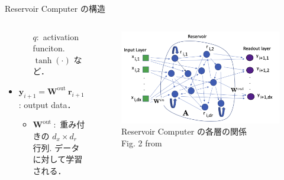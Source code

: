 \begin{frame}{Reservoir Computer の構造}
\begin{columns}[T]
\begin{column}{.5\textwidth}
\begin{itemize}
\begin{itemize}
                    $q:$ activation funciton. $\tanh(\cdot)$ など．
                \end{itemize}
                \item $\mathbf{y}_{i+1}=\mathbf{W}^{\text {out }} \mathbf{r}_{i+1}$: output data．\begin{itemize}
                    \item $\mathbf{W}^{\text {out }}:$ 重み付きの $d_x \times d_r$ 行列. データに対して学習される．
                \end{itemize}
            \end{itemize}
        \end{column}
        \begin{column}{.5\textwidth}
            \begin{figure}
                \includegraphics[width=\textwidth]{Fig/bollt_reservoir.png}
                \caption{\scriptsize{Reservoir Computer の各層の関係} \\ \tiny{Fig. 2 from \cite{Bollt}}}
            \end{figure}
        \end{column}
      \end{columns}
\end{frame}

